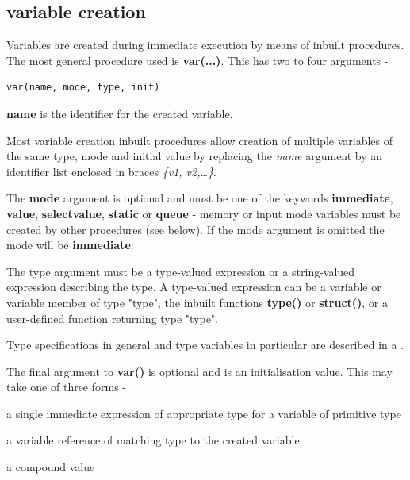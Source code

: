         \subsection{variable creation}

            Variables are created during immediate execution by means of
            inbuilt procedures. The most general procedure used is {\bf
            var(...)}. This has two to four arguments -
            \begin{lstlisting}[gobble=12, language=threepl]
               var(name, mode, type, init)
            \end{lstlisting}

            {\bf name} is the identifier for the created variable.

            Most variable creation inbuilt procedures allow creation of multiple
            variables of the same type, mode and initial value by replacing the
            {\em name} argument by an identifier list enclosed in braces {\em \{v1,
            v2,\dots\}}.

            The {\bf mode} argument is optional and must be one of the keywords
            {\bf immediate}, {\bf value}, {\bf selectvalue}, {\bf static} or
            {\bf queue} - memory or input mode variables must be created by
            other procedures (see below). If the mode argument is omitted the
            mode will be {\bf immediate}.

            The type argument must be a type-valued expression or a string-valued
            expression describing the type. A type-valued expression can be a
            variable or variable member of type "type", the inbuilt functions {\bf
            type()} or {\bf struct()}, or a user-defined function returning type
            "type".
            
            Type specifications in general and type variables in particular
            are described in a .

            The final argument to {\bf var()} is optional and is an
            initialisation value. This may take one of three forms -
            \blist
            \item   a single immediate expression of appropriate type for a
                    variable of primitive type
            \item   a variable reference of matching type to the created
                    variable
            \item   a compound value
            \blend
            
